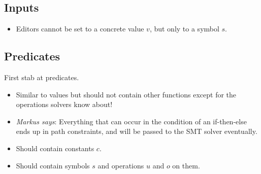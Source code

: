 \subsection{Inputs}


\begin{itemize}
  \item Editors cannot be set to a concrete value $v$, but only to a symbol $s$.
\end{itemize}



\subsection{Predicates}


First stab at predicates.
\begin{itemize}
  \item Similar to values but should not contain other functions except for the operations \SMT solvers know about!
  \item \emph{Markus says}: Everything that can occur in the condition of an if-then-else ends up in path constraints, and will be passed to the SMT solver eventually.
  \item Should contain constants $c$.
  \item Should contain symbols $s$ and operations $u$ and $o$ on them.
\end{itemize}
